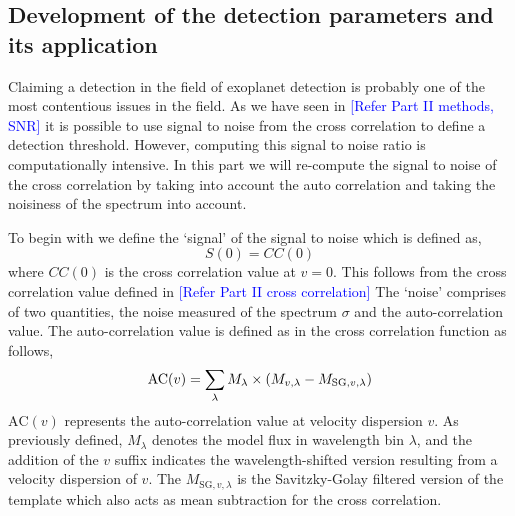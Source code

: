 \subsection{Development of the detection parameters and its application}
Claiming a detection in the field of exoplanet detection is probably one of the most contentious issues in the field.
As we have seen in \textcolor{blue}{[Refer Part II methods, SNR]} it is possible to use signal to noise from the cross correlation to define a detection threshold.
However, computing this signal to noise ratio is computationally intensive. %
In this part we will re-compute the signal to noise of the cross correlation by taking into account the auto correlation and taking the noisiness of the spectrum into account.

To begin with we define the `signal' of the signal to noise which is defined as,
\begin{equation}
    S(0) = CC(0)
    \label{eq:numerator-snr}
\end{equation}
where $CC(0)$ is the cross correlation value at $v=0$.%
This follows from the cross correlation value defined in \textcolor{blue}{[Refer Part II cross correlation]}
The `noise'  comprises of two quantities, the noise measured of the spectrum $\sigma$ and the auto-correlation value.
The auto-correlation value is defined as in the cross correlation function as follows,
\begin{equation}
    \textrm{AC}(v) = \sum\limits_{\lambda}M_{\rm{\lambda}}\times (M_{v,\lambda}-M_{\textrm{SG},v,\lambda})  
    \label{eq: AC equation}
\end{equation}
$\textrm{AC}(v)$ represents the auto-correlation value at velocity dispersion $v$. As previously defined, $M_{\lambda}$ denotes the model flux in wavelength bin $\lambda$, and the addition of the $v$ suffix indicates the wavelength-shifted version resulting from a velocity dispersion of $v$.
The $M_{\textrm{SG},v,\lambda}$ is the Savitzky-Golay filtered version of the template which also acts as mean subtraction for the cross correlation.
